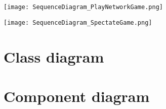 \documentclass{article}
\begin{document}
\texttt{[image: SequenceDiagram\_PlayNetworkGame.png]}
\clearpage

\texttt{[image: SequenceDiagram\_SpectateGame.png]}
\clearpage

\section{Class diagram}
\noindent{}

\section{Component diagram}
\noindent{}
\end{document}
